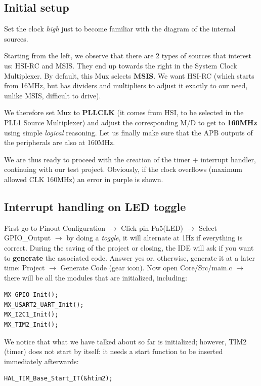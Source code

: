 \subsection{Initial setup}

Set the clock \textit{high} just to become familiar with the diagram of the internal sources.

Starting from the left, we observe that there are 2 types of sources that interest us: HSI-RC and MSIS. They end up towards the right in the System Clock Multiplexer. By default, this Mux selects \textbf{MSIS}. We want HSI-RC (which starts from 16MHz, but has dividers and multipliers to adjust it exactly to our need, unlike MSIS, difficult to drive).

We therefore set Mux to \textbf{PLLCLK} (it comes from HSI, to be selected in the PLL1 Source Multiplexer) and adjust the corresponding M/D to get to \textbf{160MHz} using simple \textit{logical} reasoning. Let us finally make sure that the APB outputs of the peripherals are also at 160MHz.

We are thus ready to proceed with the creation of the timer + interrupt handler, continuing with our test project. Obviously, if the clock overflows (maximum allowed CLK 160MHz) an error in purple is shown.

\subsection{Interrupt handling on LED toggle}

First go to Pinout-Configuration $\rightarrow$ Click pin Pa5(LED) $\rightarrow$ Select GPIO\_Output $\rightarrow$ by doing a \textit{toggle}, it will alternate at 1Hz if everything is correct. 
During the saving of the project or closing, the IDE will ask if you want to \textbf{generate} the associated code. Answer yes or, otherwise, generate it at a later time: Project $\rightarrow$ Generate Code (gear icon). Now open Core/Src/main.c $\rightarrow$ there will be all the modules that are initialized, including:

\begin{verbatim}
MX_GPIO_Init();
MX_USART2_UART_Init();
MX_I2C1_Init();
MX_TIM2_Init();
\end{verbatim}

We notice that what we have talked about so far is initialized; however, TIM2 (timer) does not start by itself: it needs a start function to be inserted immediately afterwards:

\begin{verbatim}
HAL_TIM_Base_Start_IT(&htim2);
\end{verbatim}

